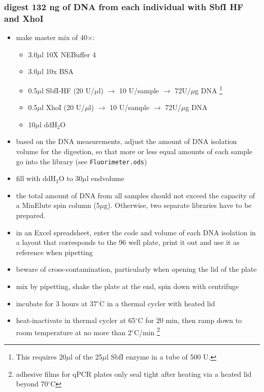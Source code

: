 \subsubsection
{digest 132 ng of DNA from each individual with SbfI HF and XhoI}
\begin{itemize}
\item make master mix of 40$\times$:
	\begin{itemize}
	\item 3.0$\mu$l 10X NEBuffer 4
	\item 3.0$\mu$l 10x BSA 
	\item 0.5$\mu$l SbfI-HF (20 U/$\mu$l) $\rightarrow$ 10 U/sample $\rightarrow$ 72U/$\mu$g DNA \footnote{This requires 20$\mu$l of the 25$\mu$l SbfI enzyme in a tube of 500 U.}
	\item 0.5$\mu$l XhoI (20 U/$\mu$l) $\rightarrow$ 10 U/sample $\rightarrow$ 72U/$\mu$g DNA
	\item 10$\mu$l ddH$_{2}$O
	\end{itemize}
\item based on the DNA measurements, adjust the amount of DNA isolation volume for the digestion, so that more or less equal amounts of each sample go into the library (see \texttt{Fluorimeter.ods})
\item fill with ddH$_{2}$O to 30$\mu$l endvolume
\item the total amount of DNA from all samples should not exceed the capacity of a MinElute spin column (5$\mu$g). Otherwise, two separate libraries have to be prepared.
\item in an Excel spreadsheet, enter the code and volume of each DNA isolation in a layout that corresponds to the 96 well plate, print it out and use it as reference when pipetting
\item beware of cross-contamination, particularly when opening the lid of the plate
\item mix by pipetting, shake the plate at the end, spin down with centrifuge
\item incubate for 3 hours at 37$^{\circ}$C in a thermal cycler with heated lid
\item heat-inactivate in thermal cycler at 65$^{\circ}$C for 20 min, then ramp down to room temperature at no more than 2$^{\circ}$C/min \footnote{adhesive films for qPCR plates only seal tight after heating via a heated lid beyond 70$^{\circ}$C}
\end{itemize}

